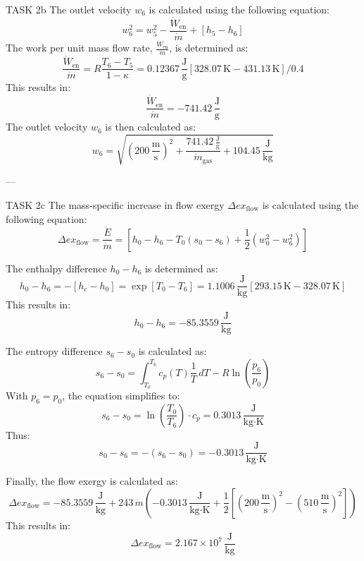 TASK 2b  
The outlet velocity \( w_6 \) is calculated using the following equation:  
\[
w_6^2 = w_5^2 - \frac{\dot{W}_{\text{en}}}{\dot{m}} + \left[h_5 - h_6\right]
\]  
The work per unit mass flow rate, \( \frac{\dot{W}_{\text{en}}}{\dot{m}} \), is determined as:  
\[
\frac{\dot{W}_{\text{en}}}{\dot{m}} = R \frac{T_6 - T_5}{1 - \kappa} = 0.12367 \, \frac{\text{J}}{\text{g}} \left[328.07 \, \text{K} - 431.13 \, \text{K}\right] / 0.4
\]  
This results in:  
\[
\frac{\dot{W}_{\text{en}}}{\dot{m}} = -741.42 \, \frac{\text{J}}{\text{g}}
\]  
The outlet velocity \( w_6 \) is then calculated as:  
\[
w_6 = \sqrt{\left(200 \, \frac{\text{m}}{\text{s}}\right)^2 + \frac{741.42 \, \frac{\text{J}}{\text{g}}}{\dot{m}_{\text{gas}}} + 104.45 \, \frac{\text{J}}{\text{kg}}}
\]  

---

TASK 2c  
The mass-specific increase in flow exergy \( \Delta ex_{\text{flow}} \) is calculated using the following equation:  
\[
\Delta ex_{\text{flow}} = \frac{\dot{E}}{\dot{m}} = \left[h_0 - h_6 - T_0 \left(s_0 - s_6\right) + \frac{1}{2} \left(w_0^2 - w_6^2\right)\right]
\]  

The enthalpy difference \( h_0 - h_6 \) is determined as:  
\[
h_0 - h_6 = -\left[h_c - h_0\right] = \exp\left[T_0 - T_6\right] = 1.1006 \, \frac{\text{J}}{\text{kg}} \left[293.15 \, \text{K} - 328.07 \, \text{K}\right]
\]  
This results in:  
\[
h_0 - h_6 = -85.3559 \, \frac{\text{J}}{\text{kg}}
\]  

The entropy difference \( s_6 - s_0 \) is calculated as:  
\[
s_6 - s_0 = \int_{T_0}^{T_6} c_p(T) \frac{1}{T} \, dT - R \ln\left(\frac{p_6}{p_0}\right)
\]  
With \( p_6 = p_0 \), the equation simplifies to:  
\[
s_6 - s_0 = \ln\left(\frac{T_0}{T_6}\right) \cdot c_p = 0.3013 \, \frac{\text{J}}{\text{kg·K}}
\]  
Thus:  
\[
s_0 - s_6 = -\left(s_6 - s_0\right) = -0.3013 \, \frac{\text{J}}{\text{kg·K}}
\]  

Finally, the flow exergy is calculated as:  
\[
\Delta ex_{\text{flow}} = -85.3559 \, \frac{\text{J}}{\text{kg}} + 243 \, \dot{m} \left(-0.3013 \, \frac{\text{J}}{\text{kg·K}} + \frac{1}{2} \left[\left(200 \, \frac{\text{m}}{\text{s}}\right)^2 - \left(510 \, \frac{\text{m}}{\text{s}}\right)^2\right]\right)
\]  
This results in:  
\[
\Delta ex_{\text{flow}} = 2.167 \times 10^7 \, \frac{\text{J}}{\text{kg}}
\]  